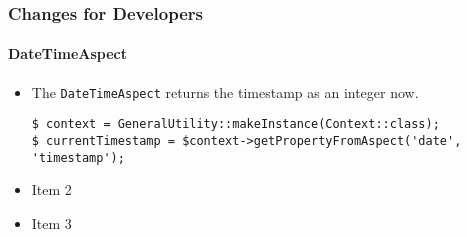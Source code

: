 %

\begin{frame}[fragile]
	\frametitle{Changes for Developers}
	\framesubtitle{DateTimeAspect}

	\begin{itemize}
		\item The \texttt{DateTimeAspect} returns the timestamp as an integer now.
\begin{lstlisting}
$ context = GeneralUtility::makeInstance(Context::class);
$ currentTimestamp = $context->getPropertyFromAspect('date', 'timestamp');
\end{lstlisting}

		\item Item 2
		\item Item 3
	\end{itemize}

\end{frame}

